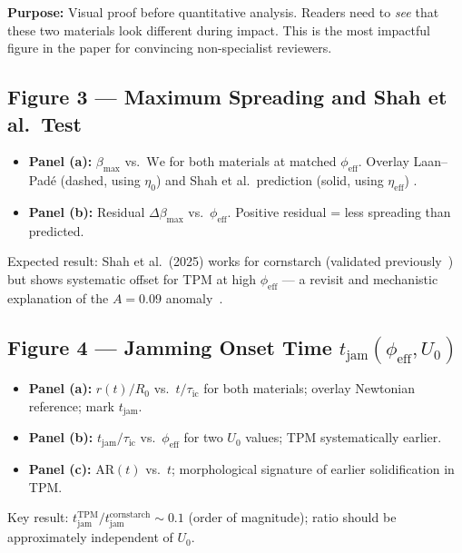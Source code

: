 \documentclass[11pt,letterpaper]{article}
\newcommand{\phieff}{\phi_{\mathrm{eff}}}
\newcommand{\tauic}{\tau_{\mathrm{ic}}}
\newcommand{\tjam}{t_{\mathrm{jam}}}
\newcommand{\etaeff}{\eta_{\mathrm{eff}}}
\newcommand{\betamax}{\beta_{\max}}
\begin{document}
\begin{intuitionbox}
\textbf{Purpose:} Visual proof before quantitative analysis. Readers need to
\emph{see} that these two materials look different during impact. This is
the most impactful figure in the paper for convincing non-specialist reviewers.
\end{intuitionbox}

\subsection{Figure 3 --- Maximum Spreading and Shah et al.\ Test}

\begin{itemize}[noitemsep,topsep=3pt]
  \item \textbf{Panel (a):} $\betamax$ vs.\ $\mathrm{We}$ for both materials
    at matched $\phieff$. Overlay Laan--Padé (dashed, using $\eta_0$) and
    Shah et al.\ prediction (solid, using $\etaeff$) \cite{Mobaseri2025}.
  \item \textbf{Panel (b):} Residual $\Delta\betamax$ vs.\ $\phieff$.
    Positive residual = less spreading than predicted.
\end{itemize}

Expected result: Shah et al.\ (2025) works for cornstarch (validated
previously~\cite{Mobaseri2025}) but shows systematic offset for TPM at
high $\phieff$ --- a revisit and mechanistic explanation of the $A = 0.09$
anomaly~\cite{Shah2022}.

\subsection{Figure 4 --- Jamming Onset Time $\tjam(\phieff, U_0)$}

\begin{itemize}[noitemsep,topsep=3pt]
  \item \textbf{Panel (a):} $r(t)/R_0$ vs.\ $t/\tauic$ for both materials;
    overlay Newtonian reference; mark $\tjam$.
  \item \textbf{Panel (b):} $\tjam/\tauic$ vs.\ $\phieff$ for two $U_0$
    values; TPM systematically earlier.
  \item \textbf{Panel (c):} $\text{AR}(t)$ vs.\ $t$; morphological signature
    of earlier solidification in TPM.
\end{itemize}

Key result: $\tjam^\mathrm{TPM}/\tjam^\mathrm{cornstarch} \sim 0.1$
(order of magnitude); ratio should be approximately independent of $U_0$.
\end{document}
